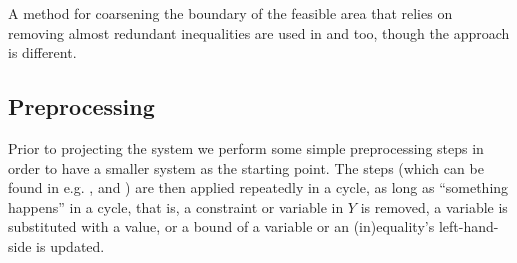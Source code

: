 A method for coarsening the boundary of the feasible area that relies on removing almost redundant inequalities are used in \cite{lukatskii08} and \cite{shapot12} too, though the approach is different.

\subsection{Preprocessing}
Prior to projecting the system we perform some simple preprocessing steps in order to have a smaller system as the starting point. The steps (which can be found in e.g. \cite{brearley75}, \cite{andersen95} and \cite{maros})
are then applied repeatedly in a cycle, as long as ``something happens'' in a cycle, that is, a constraint or variable in $Y$ is removed, a variable is substituted with a value, or a bound of a variable or an (in)equality's left-hand-side is updated.

